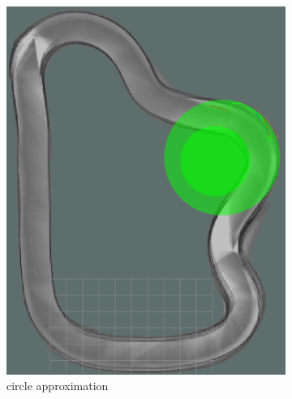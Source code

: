 \begin{figure}[H]
	\centering
	\begin{subfigure}{.45\linewidth}
		\includegraphics[width=\textwidth]{Pictures/circle approx}
		\caption{circle approximation}
		\end{subfigure}	
	\begin{subfigure}{.45\linewidth}

\end{subfigure}
\end{figure}
